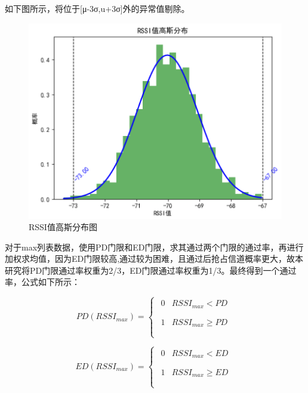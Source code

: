 如下图所示，将位于[μ-3σ,u+3σ]外的异常值剔除。

\begin{figure}[H]
	\centering
	\includegraphics[width=0.7\linewidth]{figures/4.3}
	\caption{RSSI值高斯分布图}
	\label{fig:RSSI值高斯分布图}
\end{figure}

对于max列表数据，使用PD门限和ED门限，求其通过两个门限的通过率，再进行加权求均值，因为ED门限较高,通过较为困难，且通过后抢占信道概率更大，故本研究将PD门限通过率权重为2/3，ED门限通过率权重为1/3。最终得到一个通过率，公式如下所示：

\begin{equation}
	PD\left( RSSI_{max} \right) =\left\{ \begin{array}{l}
		\begin{matrix}
			0&		RSSI_{max}<PD\\
		\end{matrix}\\
		\begin{matrix}
			1&		RSSI_{max}\ge PD\\
		\end{matrix}\\
	\end{array} \right. 
\end{equation}

\begin{equation}
	ED\left( RSSI_{max} \right) =\left\{ \begin{array}{l}
		\begin{matrix}
			0&		RSSI_{max}<ED\\
		\end{matrix}\\
		\begin{matrix}
			1&		RSSI_{max}\ge ED\\
		\end{matrix}\\
	\end{array} \right. 
\end{equation}

